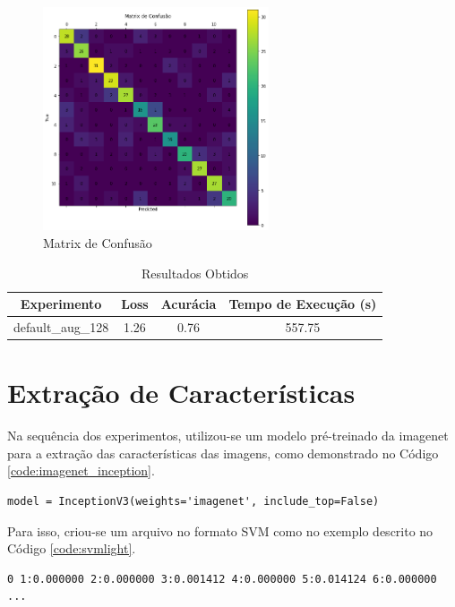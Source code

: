 \documentclass[12pt]{article}
\begin{document}
\begin{figure}[!htb]
  \centering
  \includegraphics[width=18em]{experiments/lenet5_aug_128/confusion_matrix.png}
  \caption{Matrix de Confusão}
  \label{fig:experiment_lenet5_aug_128_confusion_matrix}
\end{figure}

\begin{table}[!htb]
  \centering
  \begin{tabular}{|c|c|c|c|}
    \hline
    \textbf{Experimento} & \textbf{Loss} & \textbf{Acurácia} & \textbf{Tempo de Execução (s)} \\ \hline
    default\_aug\_128    & 1.26          & 0.76              & 557.75                         \\ \hline
  \end{tabular}
  \caption{Resultados Obtidos}
  \label{tab:experiment_lenet_aug_128_reults}
\end{table}

\section{Extração de Características}

Na sequência dos experimentos, utilizou-se um modelo pré-treinado da imagenet para a extração das características das imagens, como demonstrado no Código \ref{code:imagenet_inception}.

\begin{lstlisting}[caption={ImageNet - InceptionV3},captionpos=b,frame=single,label={code:imagenet_inception}]
model = InceptionV3(weights='imagenet', include_top=False)
\end{lstlisting}

Para isso, criou-se um arquivo no formato SVM como no exemplo descrito no Código \ref{code:svmlight}.

\begin{lstlisting}[caption={Exemplo do Formato de Entrada},captionpos=b,frame=single,label={code:svmlight}]
0 1:0.000000 2:0.000000 3:0.001412 4:0.000000 5:0.014124 6:0.000000 ...
\end{lstlisting}
\end{document}
